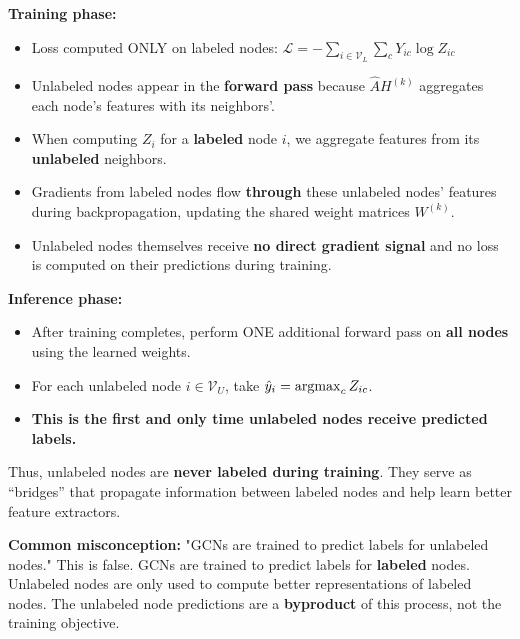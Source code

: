 \begin{notechapter}
\begin{correctionbox}
\textbf{Training phase:}
\begin{itemize}
    \item Loss computed ONLY on labeled nodes: 
          $\mathcal{L} = -\sum_{i \in \mathcal{V}_L}\sum_c Y_{ic}\log Z_{ic}$
    \item Unlabeled nodes appear in the \textbf{forward pass} because 
          $\hat{A}H^{(k)}$ aggregates each node's features with its neighbors'.
    \item When computing $Z_i$ for a \textbf{labeled} node $i$, we aggregate
          features from its \textbf{unlabeled} neighbors.
    \item Gradients from labeled nodes flow \textbf{through} these unlabeled
          nodes' features during backpropagation, updating the shared weight
          matrices $W^{(k)}$.
    \item Unlabeled nodes themselves receive \textbf{no direct gradient signal}
          and no loss is computed on their predictions during training.
\end{itemize}

\textbf{Inference phase:}
\begin{itemize}
    \item After training completes, perform ONE additional forward pass on
          \textbf{all nodes} using the learned weights.
    \item For each unlabeled node $i \in \mathcal{V}_U$, take
          $\hat{y}_i = \operatorname*{argmax}_c Z_{ic}$.
    \item \textbf{This is the first and only time unlabeled nodes receive
          predicted labels.}
\end{itemize}

Thus, unlabeled nodes are \textbf{never labeled during training}. They serve as
``bridges'' that propagate information between labeled nodes and help learn
better feature extractors.
\end{correctionbox}

\begin{warningbox}
\textbf{Common misconception:} "GCNs are trained to predict labels for unlabeled
nodes." This is false. GCNs are trained to predict labels for \textbf{labeled}
nodes. Unlabeled nodes are only used to compute better representations of
labeled nodes. The unlabeled node predictions are a \textbf{byproduct} of this
process, not the training objective.
\end{warningbox}


\end{notechapter}
